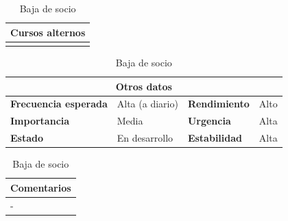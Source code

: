 \documentclass[12pt,spanish]{article}
\begin{document}
\begin{table}[H]
\vspace{1cm}

\begin{tabular}{|m{10pt}|m{7.15cm}|m{10pt}|m{7.15cm}|}
\hline
\multicolumn{4}{|m{16.2cm}|}{\textbf{Cursos alternos}} \\
\hline
\\
\hline
\end{tabular}

\vspace{1cm}

\begin{tabular}{|m{3.72cm}|m{3.72cm}|m{3.72cm}|m{3.72cm}|}
\hline
\multicolumn{4}{|c|}{\textbf{Otros datos}} \\
\hline
\textbf{Frecuencia esperada} & Alta (a diario) & \textbf{Rendimiento} & Alto \\
\hline
\textbf{Importancia} & Media & \textbf{Urgencia} & Alta \\
\hline
\textbf{Estado} & En desarrollo & \textbf{Estabilidad} & Alta \\
\hline
\end{tabular}

\vspace{1cm}

\begin{tabular}{|m{16.2cm}|}
\hline
\textbf{Comentarios} \\
\hline
- \\
\hline
\end{tabular}

\caption{Baja de socio}

\end{table}

\end{document}
